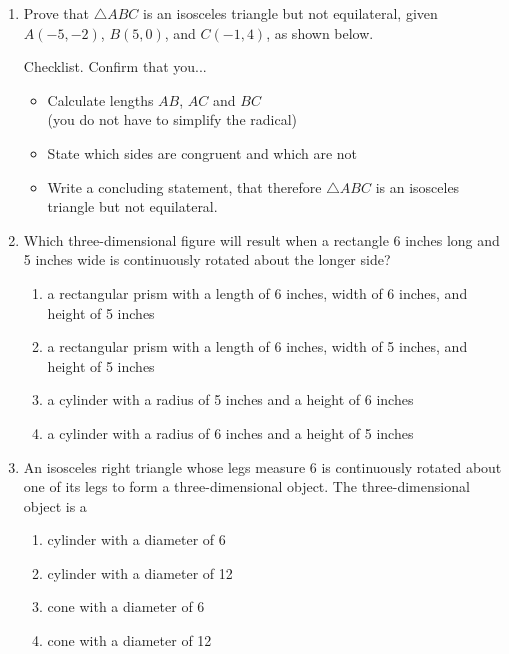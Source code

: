 \documentclass[12pt, twoside]{article}
\begin{document}
\begin{enumerate}
\newpage
  \item Prove that $\triangle ABC$ is an isosceles triangle but not equilateral, given $A(-5,-2)$, $B(5,0)$, and $C(-1,4)$, as shown below.
    \begin{multicols}{2}
      Checklist. Confirm that you...
      \begin{itemize}
        \item Calculate lengths $AB$, $AC$ and $BC$\\
        (you do not have to simplify the radical)
        \item State which sides are congruent and which are not
        \item Write a concluding statement, that therefore $\triangle ABC$ is an isosceles triangle but not equilateral.
      \end{itemize}
    \end{multicols}

\newpage
  \item Which three-dimensional figure will result when a rectangle 6 inches long and 5 inches wide is continuously rotated about the longer side?
    \begin{enumerate}
      \item a rectangular prism with a length of 6 inches, width of 6 inches, and height of 5 inches
      \item a rectangular prism with a length of 6 inches, width of 5 inches, and height of 5 inches
      \item a cylinder with a radius of 5 inches and a height of 6 inches
      \item a cylinder with a radius of 6 inches and a height of 5 inches
    \end{enumerate} \vspace{1cm}

 \item An isosceles right triangle whose legs measure 6 is continuously rotated about one of its legs to form a three-dimensional object. The three-dimensional object is a
  \begin{enumerate}
    \item cylinder with a diameter of 6
    \item cylinder with a diameter of 12
    \item cone with a diameter of 6
    \item cone with a diameter of 12
  \end{enumerate} \vspace{1cm}


\end{enumerate}
\end{document}
